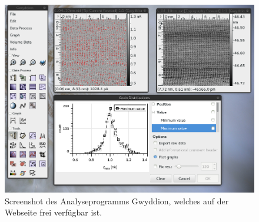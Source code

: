 \begin{figure}
\includegraphics[width=18cm]{pics/gwyddion_screenshot}
\caption{Screenshot des Analyseprogramms Gwyddion, welches
auf der Webseite frei verfügbar ist\cite{gwyddion}.}
 \label{fig:gwyddion_screenshot}

\end{figure}
